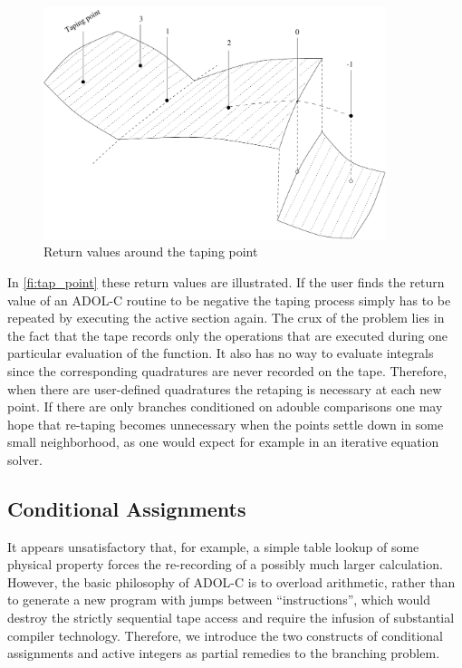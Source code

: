 \documentclass[11pt,twoside]{article}
\begin{document}
\begin{figure}[h]
\centering\includegraphics[width=10.0cm]{tap_point}
\caption{Return values around the taping point}
\label{fi:tap_point}
\end{figure}          

In \autoref{fi:tap_point} these return values are illustrated.
If the user finds the return value of an ADOL-C routine to be negative the
taping process simply has to be repeated by executing the active section again.
The crux of the problem lies in the fact that the tape records only
the operations that are executed during one particular evaluation of the 
function.
It also has no way to evaluate integrals since the corresponding
quadratures are never recorded on the tape. 
Therefore, when there are user-defined quadratures the retaping is necessary at each
new point. If there are only branches conditioned on {\sf adouble}
comparisons one may hope that re-taping becomes unnecessary when
the points settle down in some small neighborhood, as one would 
expect for example in an iterative equation solver. 
%
\subsection{Conditional Assignments}
\label{condassign}
%
It appears unsatisfactory that, for example, a simple table lookup 
of some physical property forces the re-recording of a possibly 
much larger calculation. However, the basic philosophy of ADOL-C 
is to overload arithmetic, rather than to generate a new program
with jumps between ``instructions'', which would destroy the 
strictly sequential tape access and
require the infusion of substantial compiler technology. 
Therefore, we introduce the two constructs of conditional
assignments and active integers as partial remedies to the
branching problem. 
\end{document}
